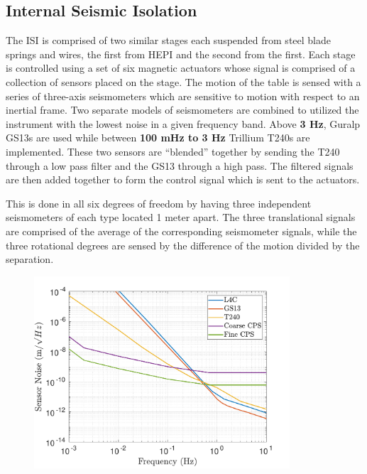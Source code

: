 \documentclass [12pt, proquest]{uwthesis}[2019]
\begin{document}
\subsection{Internal Seismic Isolation}\label{ISI}

The ISI is comprised of two similar stages each suspended from steel blade springs and wires, the first from HEPI and the second from the first. Each stage is controlled using a set of six magnetic actuators whose signal is comprised of a collection of sensors placed on the stage. The motion of the table is sensed with a series of three-axis seismometers which are sensitive to motion with respect to an inertial frame. Two separate models of seismometers are combined to utilized the instrument with the lowest noise in a given frequency band. Above \textbf{3 Hz}, Guralp GS13s are used while between \textbf{100 mHz to 3 Hz} Trillium T240s are implemented. These two sensors are ``blended'' together by sending the T240 through a low pass filter and the GS13 through a high pass. The filtered signals are then added together to form the control signal which is sent to the actuators. 

This is done in all six degrees of freedom by having three independent seismometers of each type located 1 meter apart. The three translational signals are comprised of the average of the corresponding seismometer signals, while the three rotational degrees are sensed by the difference of the motion divided by the separation.

\begin{figure}%
\begin{center}
\includegraphics[width=0.85\textwidth]{seismicSensNoise.pdf}
\caption[Sensor noise for the seismic isolation system]{}
\label{seisNoise}
\end{center}
\end{figure}
\end{document}
